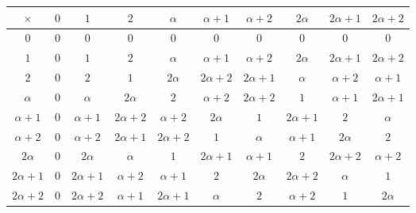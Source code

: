 \documentclass{article}
\numberwithin{equation}{subsection}
\begin{document}
		\vspace{10pt}
		\begin{center}
			\begin{tabular}{| c | | c | c | c | c | c | c | c | c | c |}
				\hline
				$\times$ 				& $0$ &	$1$	&	$2$	&	$\alpha$	&	$\alpha +1$	& $\alpha +2$	&	$2\alpha$	&	$2\alpha +1$	&	$2\alpha +2$\\ \hline \hline
				$0$							&	$0$	&	$0$	&	$0$	&	$0$	&	$0$	&	$0$	&	$0$	&	$0$	&	$0$	\\ \hline	
				$1$							&	$0$	&	$1$	&	$2$	&	$\alpha$	&	$\alpha+1$	&	$\alpha+2$	&	$2\alpha$	&	$2\alpha+1$	&	$2\alpha+2$	\\ \hline	
				$2$							&	$0$	&	$2$	&	$1$	&	$2\alpha$	&	$2\alpha+2$	&	$2\alpha +1$	&	$\alpha$	&	$\alpha +2$	&	$\alpha +1$	\\ \hline	
				$\alpha$				&	$0$	&	$\alpha$	&	$2\alpha$	&	$2$	&	$\alpha +2$	&	$2\alpha+2$	&	$1$	&	$\alpha +1$	&	$2\alpha+1$	\\ \hline	
				$\alpha +1$			&	$0$	&	$\alpha +1$	&	$2\alpha +2$	&	$\alpha +2$	&	$2\alpha$	&	$1$	&	$2\alpha +1$	&	$2$	&	$\alpha$	\\ \hline	
				$\alpha +2$			&	$0$	&	$\alpha+2$	&	$2\alpha +1$	&	$2\alpha +2$	&	$1$	&	$\alpha$	&	$\alpha +1$	&	$2\alpha$	&	$2$	\\ \hline	
				$2\alpha$				&	$0$	&	$2\alpha$	&	$\alpha$	&	$1$	&	$2\alpha +1$	&	$\alpha +1$	&	$2$	&	$2\alpha +2$	&	$\alpha +2$	\\ \hline	
				$2\alpha +1$		&	$0$	&	$2\alpha +1$	&	$\alpha +2$	&	$\alpha +1$	&	$2$	&	$2\alpha$	&	$2\alpha +2$	&	$\alpha$	&	$1$	\\ \hline	
				$2\alpha +2$		&	$0$	&	$2\alpha +2$	&	$\alpha+1$	&	$2\alpha +1$	&	$\alpha$	&	$2$	&	$\alpha+2$	&	$1$	&	$2\alpha$	\\ \hline	
			\end{tabular}	
		\end{center}
\end{document}
